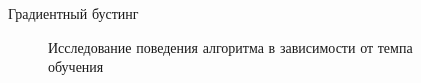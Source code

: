 \documentclass[12pt]{article}
\begin{document}
\begin{section}{Градиентный бустинг}
\begin{figure}[h!]
\begin{minipage}[h]{0.5\linewidth}
\end{minipage}
\hfill
\begin{minipage}[h]{0.5\linewidth}
\end{minipage}
\caption{Исследование поведения алгоритма в зависимости от темпа обучения}
\label{ris:image1}
\end{figure}


\end{section}
\end{document}
